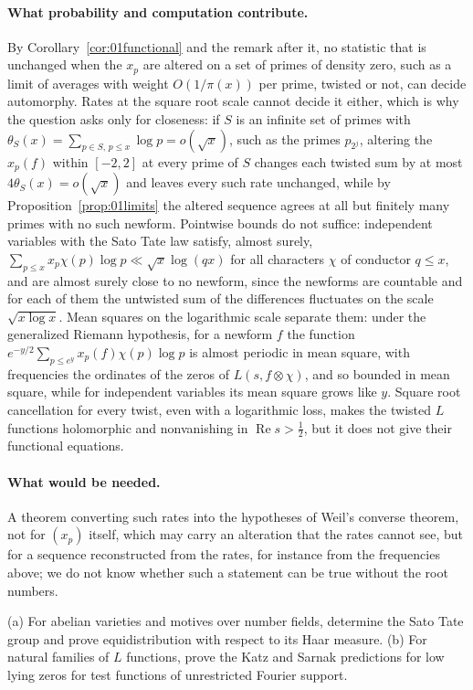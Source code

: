 \paragraph{What probability and computation contribute.} By Corollary~\ref{cor:01functional} and the remark after it, no statistic that is unchanged when the $x_p$ are altered on a set of primes of density zero, such as a limit of averages with weight $O(1/\pi(x))$ per prime, twisted or not, can decide automorphy. Rates at the square root scale cannot decide it either, which is why the question asks only for closeness: if $S$ is an infinite set of primes with $\theta_S(x)=\sum_{p\in S,\,p\le x}\log p=o(\sqrt x)$, such as the primes $p_{2^j}$, altering the $x_p(f)$ within $[-2,2]$ at every prime of $S$ changes each twisted sum by at most $4\theta_S(x)=o(\sqrt x)$ and leaves every such rate unchanged, while by Proposition~\ref{prop:01limits} the altered sequence agrees at all but finitely many primes with no such newform. Pointwise bounds do not suffice: independent variables with the Sato Tate law satisfy, almost surely, $\sum_{p\le x}x_p\chi(p)\log p\ll\sqrt x\log(qx)$ for all characters $\chi$ of conductor $q\le x$, and are almost surely close to no newform, since the newforms are countable and for each of them the untwisted sum of the differences fluctuates on the scale $\sqrt{x\log x}$. Mean squares on the logarithmic scale separate them: under the generalized Riemann hypothesis, for a newform $f$ the function $e^{-y/2}\sum_{p\le e^y}x_p(f)\chi(p)\log p$ is almost periodic in mean square, with frequencies the ordinates of the zeros of $L(s,f\otimes\chi)$, and so bounded in mean square, while for independent variables its mean square grows like $y$. Square root cancellation for every twist, even with a logarithmic loss, makes the twisted $L$ functions holomorphic and nonvanishing in $\operatorname{Re}s>\tfrac12$, but it does not give their functional equations.

\paragraph{What would be needed.} A theorem converting such rates into the hypotheses of Weil's converse theorem, not for $(x_p)$ itself, which may carry an alteration that the rates cannot see, but for a sequence reconstructed from the rates, for instance from the frequencies above; we do not know whether such a statement can be true without the root numbers.

\begin{problem}\label{op:stgroups}
(a) For abelian varieties and motives over number fields, determine the Sato Tate group and prove equidistribution with respect to its Haar measure. (b) For natural families of $L$ functions, prove the Katz and Sarnak predictions for low lying zeros for test functions of unrestricted Fourier support.
\end{problem}

